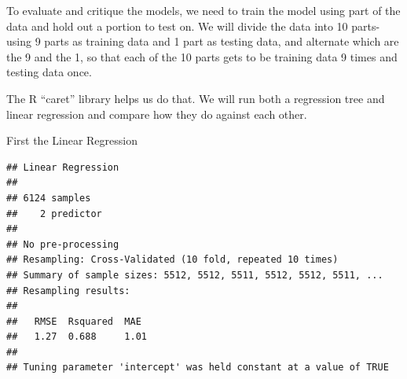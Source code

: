 \documentclass[12pt, krantz2,]{krantz}
\makeatletter
\newenvironment{Shaded}{\begin{snugshade}}{\end{snugshade}}
\newcommand{\CommentTok}[1]{\textcolor[rgb]{0.37,0.37,0.37}{\textit{#1}}}
\newcommand{\DataTypeTok}[1]{\textcolor[rgb]{0.27,0.27,0.27}{#1}}
\newcommand{\DecValTok}[1]{\textcolor[rgb]{0.06,0.06,0.06}{#1}}
\newcommand{\FloatTok}[1]{\textcolor[rgb]{0.06,0.06,0.06}{#1}}
\newcommand{\KeywordTok}[1]{\textcolor[rgb]{0.27,0.27,0.27}{\textbf{#1}}}
\newcommand{\NormalTok}[1]{#1}
\newcommand{\OperatorTok}[1]{\textcolor[rgb]{0.43,0.43,0.43}{\textbf{#1}}}
\newcommand{\OtherTok}[1]{\textcolor[rgb]{0.37,0.37,0.37}{#1}}
\newcommand{\StringTok}[1]{\textcolor[rgb]{0.5,0.5,0.5}{#1}}
\newenvironment{kframe}{%
\medskip{}
\setlength{\fboxsep}{.8em}
 \def\at@end@of@kframe{}%
 \ifinner\ifhmode%
  \def\at@end@of@kframe{\end{minipage}}%
  \begin{minipage}{\columnwidth}%
 \fi\fi%
 \def\FrameCommand##1{\hskip\@totalleftmargin \hskip-\fboxsep
 \colorbox{shadecolor}{##1}\hskip-\fboxsep
     \hskip-\linewidth \hskip-\@totalleftmargin \hskip\columnwidth}%
 \MakeFramed {\advance\hsize-\width
   \@totalleftmargin\z@ \linewidth\hsize
   \@setminipage}}%
 {\par\unskip\endMakeFramed%
 \at@end@of@kframe}
\renewenvironment{Shaded}{\begin{kframe}}{\end{kframe}}
\makeatother
\begin{document}
To evaluate and critique the models, we need to train the model using part of the data and hold out a portion to test on. We will divide the data into 10 parts- using 9 parts as training data and 1 part as testing data, and alternate which are the 9 and the 1, so that each of the 10 parts gets to be training data 9 times and testing data once.

The R ``caret'' library helps us do that. We will run both a regression tree and linear regression and compare how they do against each other.

First the Linear Regression

\begin{Shaded}
\end{Shaded}

\begin{verbatim}
## Linear Regression 
## 
## 6124 samples
##    2 predictor
## 
## No pre-processing
## Resampling: Cross-Validated (10 fold, repeated 10 times) 
## Summary of sample sizes: 5512, 5512, 5511, 5512, 5512, 5511, ... 
## Resampling results:
## 
##   RMSE  Rsquared  MAE 
##   1.27  0.688     1.01
## 
## Tuning parameter 'intercept' was held constant at a value of TRUE
\end{verbatim}
\end{document}
